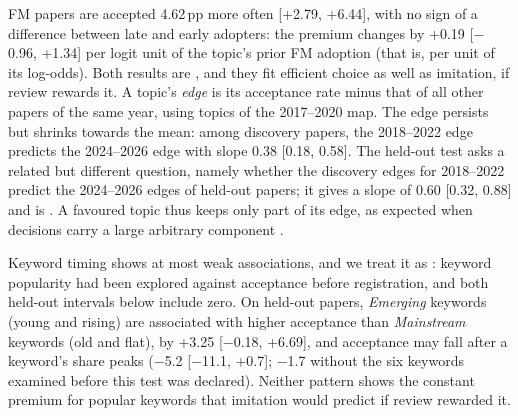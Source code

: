 FM papers are accepted 4.62\,pp more often [+2.79, +6.44], with no sign of a difference between late and early adopters: the premium changes by +0.19 [$-$0.96, +1.34] per logit unit of the topic's prior FM adoption (that is,
per unit of its log-odds). Both results are , and they fit efficient choice as well as imitation, if
review rewards it. A topic's \emph{edge} is its acceptance rate minus that of all other papers of the same year, using
topics of the 2017--2020 map. The edge persists but shrinks towards the mean: among discovery papers, the 2018--2022
edge predicts the 2024--2026 edge with slope 0.38 [0.18, 0.58]. The held-out test asks a related but different
question, namely whether the discovery edges for 2018--2022 predict the 2024--2026 edges of held-out papers; it gives a
slope of 0.60 [0.32, 0.88] and is . A favoured topic thus keeps only part of its edge, as
expected when decisions carry a large arbitrary component \citep{cortes2021inconsistency,beygelzimer2023has}.

Keyword timing shows at most weak associations, and we treat it as : keyword popularity had been
explored against acceptance before registration, and both held-out intervals below include zero. On held-out papers,
\emph{Emerging} keywords (young and rising) are associated with higher acceptance than \emph{Mainstream} keywords (old
and flat), by +3.25 [$-$0.18, +6.69], and acceptance may fall after a keyword's share peaks ($-$5.2 [$-$11.1, +0.7];
$-$1.7 without the six keywords examined before this test was declared). Neither pattern shows the constant premium for
popular keywords that imitation would predict if review rewarded it.

